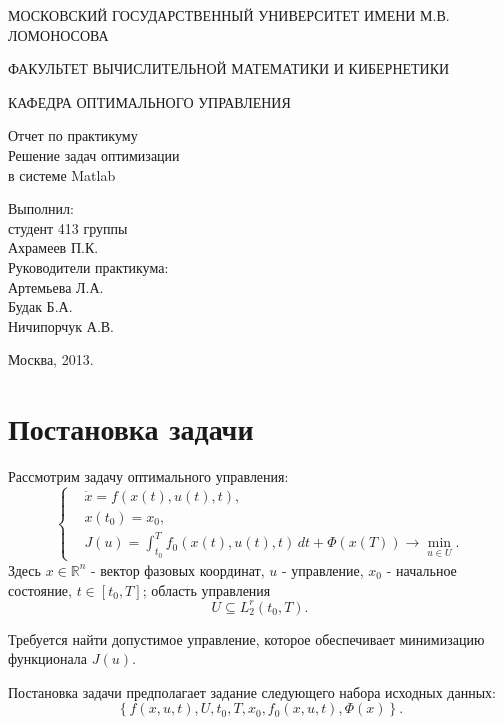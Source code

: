 \documentclass[oneside,final,12pt]{extreport}
\begin{document}
 
\begin{titlepage}
\centerline{МОСКОВСКИЙ ГОСУДАРСТВЕННЫЙ УНИВЕРСИТЕТ ИМЕНИ М.В. ЛОМОНОСОВА}
\centerline{ФАКУЛЬТЕТ ВЫЧИСЛИТЕЛЬНОЙ МАТЕМАТИКИ И КИБЕРНЕТИКИ}
\centerline{КАФЕДРА ОПТИМАЛЬНОГО УПРАВЛЕНИЯ}
\centerline{\hfill\hrulefill\hrulefill\hfill}
\vfill
\vfill
\begin{Large}
\begin{centering}
Отчет по практикуму \\
Решение задач оптимизации \\
в системе Matlab \\
\end{centering}
\end{Large}
\vfill
\vfill
\begin{flushright}
Выполнил:\\
студент 413 группы\\
Ахрамеев П.К.\\
\vfill
Руководители практикума:\\
Артемьева Л.А.\\Будак Б.А.\\Ничипорчук А.В.\\
\end{flushright}
\vfill
\vfill
\centerline{Москва, 2013.}
\end{titlepage}
 
\setcounter{page}{2}
\tableofcontents
 
\chapter{Постановка задачи}
 
Рассмотрим задачу оптимального управления:
$$
\left\{\begin{aligned} & \dot x=f(x(t),u(t),t), \\ & x(t_0)=x_0, \\ & J(u)=\int_{t_0}^T f_0(x(t),u(t),t) \, dt+ \Phi(x(T))\rightarrow \min_{u \in U}. \end{aligned}\right.
$$
Здесь $x\in \mathbb{R}^n $ - вектор фазовых координат, $u$ - управление, $x_0$ - начальное состояние, $t\in[t_0,T]$; область управления
$$ U\subseteq L_2^r(t_0,T).$$
 
Требуется найти допустимое управление, которое обеспечивает минимизацию функционала $J(u)$.
 
Постановка задачи предполагает задание следующего набора исходных данных:
$$\left\{f(x,u,t),U,t_0,T,x_0,f_0(x,u,t),\Phi(x)\right\}.$$
 
\end{document}
